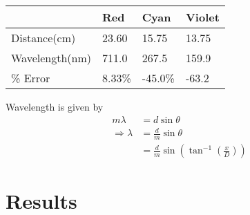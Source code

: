 \documentclass[twocolumn,english]{IEEEtran}
\theoremstyle{plain}
\theoremstyle{plain}
\begin{document}
\begin{table}[!htpb]
\centering
\begin{tabular}{@{}llll@{}}
\toprule
				& Red		& Cyan 		& Violet 		\\ \midrule
Distance(cm)   	& 23.60		& 15.75 	& 13.75    		\\
Wavelength(nm) 	& 711.0     & 267.5 	& 159.9     	\\
\% Error   		& 8.33\%    & -45.0\% 	& -63.2     	\\ \bottomrule
\end{tabular}
\end{table}

Wavelength is given by
\begin{align*}
	m\lambda &= d\sin\theta \\
	\Rightarrow\lambda &= \frac{d}{m}\sin\theta \\
			&= \frac{d}{m}\sin\left(\tan^{-1}\left(\frac{x}{D}\right)\right)
\end{align*}

\section{Results}
\end{document}
